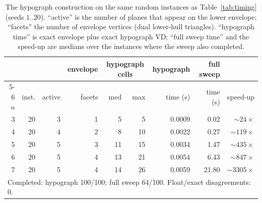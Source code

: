 \begin{table}[htbp]
\centering
\begin{tabular}{rrrrrrrrr}
\toprule
& & & envelope & \multicolumn{2}{c}{hypograph cells} & hypograph & full sweep & \\
\cmidrule(lr){5-6}
$n$ & inst. & active & facets & med & max & time (s) & time (s) & speed-up \\
\midrule
3 & 20 & 3 & 1 & 5 & 5 & 0.0009 & 0.02 & ${\sim}24\times$ \\
4 & 20 & 4 & 2 & 8 & 10 & 0.0022 & 0.27 & ${\sim}119\times$ \\
5 & 20 & 5 & 3 & 11 & 15 & 0.0034 & 1.47 & ${\sim}435\times$ \\
6 & 20 & 5 & 4 & 13 & 21 & 0.0054 & 6.43 & ${\sim}847\times$ \\
7 & 20 & 5 & 4 & 14 & 26 & 0.0059 & 21.80 & ${\sim}3305\times$ \\
\midrule
\multicolumn{9}{l}{Completed: hypograph 100/100; full sweep 64/100. Float/exact disagreements: 0.} \\
\bottomrule
\end{tabular}
\caption{The hypograph construction on the same random instances as Table~\ref{tab:timing} (seeds $1..20$). ``active'' is the number of planes that appear on the lower envelope; ``facets'' the number of envelope vertices (dual lower-hull triangles). ``hypograph time'' is exact envelope plus exact hypograph VD; ``full sweep time'' and the speed-up are medians over the instances where the sweep also completed.}
\label{tab:hypograph}
\end{table}
